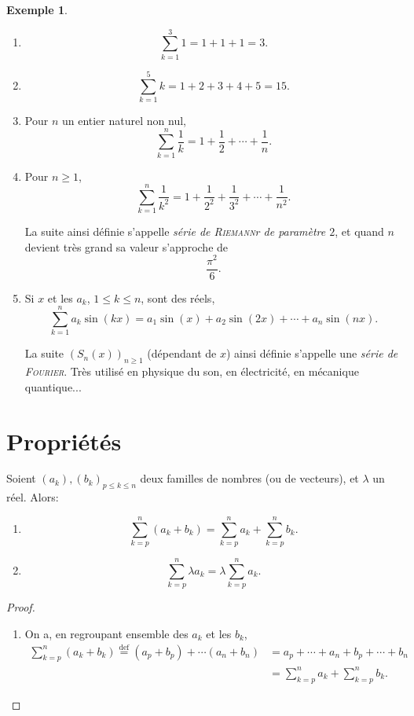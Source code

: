 \documentclass[twoside,12pt]{article}
\theoremstyle{definition}
\newtheorem{exe}{Exemple}
\theoremstyle{remark}
\theoremstyle{plain}
\newcommand\myeq{\overset{\mathrm{def}}{=}}
\begin{document}
\begin{exe}\leavevmode
\begin{enumerate}
\item \[ \sum_{k=1}^3 1 = 1 + 1 + 1 = 3. \]
\item \[ \sum_{k=1}^5 k = 1 + 2 + 3 + 4 + 5 = 15. \]
\item Pour $n$ un entier naturel non nul, \[ \sum_{k=1}^{n} \frac 1 k = 1 + \frac 1 2 + \cdots + \frac 1 n. \]
\item Pour $n\geq 1$,
\[ \sum_{k=1}^n \frac 1 {k^2} = 1 + \frac 1 {2^2} + \frac 1 {3^2} + \cdots + \frac 1 {n^2}. \]
\begin{rem}
La suite ainsi définie s'appelle \textit{série de \textsc{Riemann}r de paramètre $2$}, et quand $n$ devient très grand sa valeur s'approche de
\[ \frac {\pi^2} 6. \]
\end{rem}
\item Si $x$ et les $a_k$, $1\leq k\leq n$, sont des réels,
\[ \sum_{k=1}^n a_k\sin(kx) = a_1\sin(x) + a_2\sin(2x) + \cdots + a_n\sin(nx). \]
\begin{rem}
La suite $\left(S_n(x)\right)_{n\geq 1}$ (dépendant de $x$) ainsi définie s'appelle une \textit{série de \textsc{Fourier}}. Très utilisé en physique du son, en électricité, en mécanique quantique...
\end{rem}
\end{enumerate}
\end{exe}

\section{Propriétés}

\begin{prop}
Soient $(a_k), (b_k)_{p\leq k\leq n}$ deux familles de nombres (ou de vecteurs), et $\lambda$ un réel. Alors:
\begin{enumerate}
\item \[ 
\sum_{k=p}^n (a_k + b_k) = \sum_{k=p}^n a_k + \sum_{k=p}^n b_k.
\]
\item \[
\sum_{k=p}^n \lambda a_k = \lambda\sum_{k=p}^n a_k.
\]
\end{enumerate}
\end{prop}

\begin{proof}
\begin{enumerate}
\item On a, en regroupant ensemble des $a_k$ et les $b_k$,
\begin{align*}
\sum_{k=p}^n (a_k+b_k) \myeq (a_p+b_p) + \cdots (a_n+b_n) &= a_p + \cdots + a_n + b_p + \cdots + b_n\\ &= \sum_{k=p}^n a_k + \sum_{k=p}^n b_k. 
\end{align*}
\end{enumerate}
\end{proof}
\end{document}
